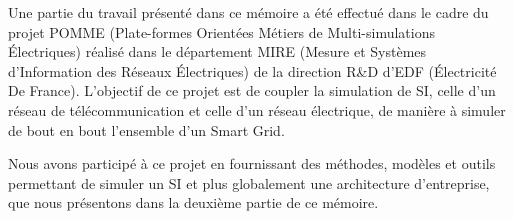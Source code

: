 Une partie du travail présenté dans ce mémoire a été effectué dans le cadre du projet
POMME (Plate-formes Orientées Métiers de Multi-simulations Électriques) 
réalisé dans le département MIRE (Mesure et Systèmes d'Information des Réseaux Électriques) 
de la direction R\&D d'EDF (Électricité De France). L'objectif de ce projet est de coupler la simulation de SI, celle d'un
réseau de télécommunication et celle d'un réseau électrique, de manière à simuler de bout en bout l'ensemble d'un Smart Grid.

Nous avons participé à ce projet en fournissant des méthodes, modèles et outils
permettant de simuler un SI et plus globalement une architecture
d'entreprise, que nous présentons dans la deuxième partie de ce mémoire. 





